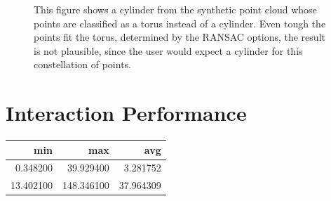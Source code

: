 \begin{figure}[h]
\centering
{}%
{}      
\caption[Implausible torus is detected instead of a more plausible cylinder. ]
{This figure shows a cylinder from the synthetic point cloud whose points are classified as a torus instead of a cylinder. Even tough the points fit the torus, determined by the RANSAC options, the result is not plausible, since the user would expect a cylinder for this constellation of points. }
\label{fig:missfittedTorus}
\end{figure}


\section{Interaction Performance}

	\begin{center}
	\begin{tabular}{ r| r | r }
			\textbf{min}	& \textbf{max}	& \textbf{avg} \\
			\hline
			0.348200 & 39.929400 & 3.281752\\
	13.402100 & 148.346100 & 37.964309 \\
	\end{tabular}
	\caption{Benchmark Point Picking}
	\end{center}


